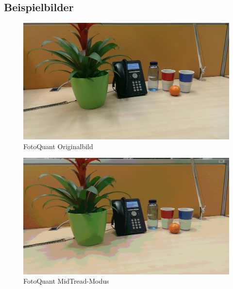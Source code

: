 \subsection{Beispielbilder}

\begin{landscape}

\begin{figure}[h]
	\centering
		\includegraphics[width=1.4\textwidth]{img/Fotos/FotoQuant_Original.jpg}
	\caption[FotoQuant Original]{FotoQuant Originalbild}
	\label{fig:quant_ori}
\end{figure}

\begin{figure}[h]
	\centering
		\includegraphics[width=1.4\textwidth]{img/Fotos/FotoQuant_Lloyd.jpg}
	\caption[FotoQuant MidTread]{FotoQuant MidTread-Modus}
	\label{fig:quant_mid}
\end{figure}


\end{landscape}
